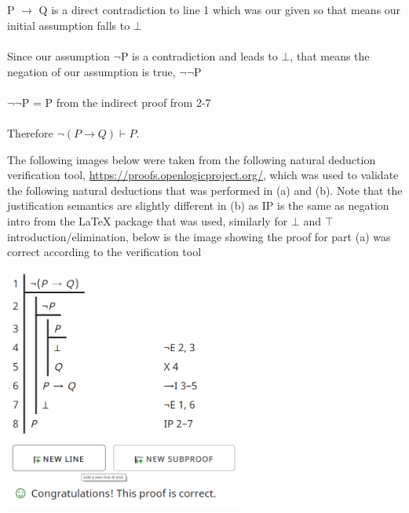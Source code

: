 \documentclass{article}
\begin{document}
\begin{enumerate}[(a)]
        \\\\P $\to$ Q is a direct contradiction to line 1 which was our given so that means our initial assumption falls to $\bot$
        \\\\Since our assumption $\neg$P is a contradiction and leads to $\bot$, that means the negation of our assumption is true, $\neg\neg$P
        \\\\$\neg\neg$P = P from the indirect proof from 2-7
        \\\\Therefore $\neg(P \to Q)\vdash P$.
    \end{enumerate}
\newpage
\begin{flushleft}
The following images below were taken from the following natural deduction verification tool,  \href{https://proofs.openlogicproject.org/}{https://proofs.openlogicproject.org/}, which was used to validate the following natural deductions that was performed in (a) and (b). Note that the justification semantics are slightly different in (b) as IP is the same as negation intro from the LaTeX package that was used, similarly for $\bot$ and $\top$ introduction/elimination, below is the image showing the proof for part (a) was correct according to the verification tool\\
\end{flushleft}
\begin{centering}\hspace*{1pt}\includegraphics[width=300px, height = 300px]{3a.png}\end{centering}
\newpage
\end{document}
